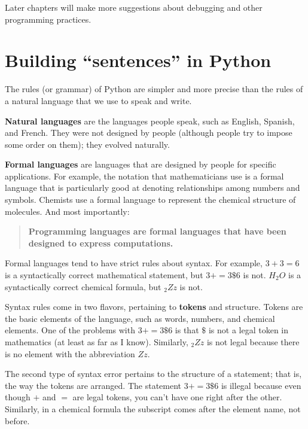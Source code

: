 \documentclass[10pt]{book}
\begin{document}
Later chapters will make more suggestions about debugging and other
programming practices.

\section{Building ``sentences'' in Python}

The rules (or grammar) of Python are simpler and more precise than 
the rules of a natural language that we use to speak and write.

{\bf Natural languages} are the languages people speak,
such as English, Spanish, and French.  They were not designed
by people (although people try to impose some order on them);
they evolved naturally.

{\bf Formal languages} are languages that are designed by people for
specific applications.  For example, the notation that mathematicians
use is a formal language that is particularly good at denoting
relationships among numbers and symbols.  Chemists use a formal
language to represent the chemical structure of molecules.  And
most importantly:

\begin{quote}
{\bf Programming languages are formal languages that have been
designed to express computations.}
\end{quote}

Formal languages tend to have strict rules about syntax.  For example,
$3 + 3 = 6$ is a syntactically correct mathematical statement, but 
$3 + = 3 \mbox{\$} 6$ is not.  $H_2O$ is a syntactically correct
chemical formula, but $_2Zz$ is not.

Syntax rules come in two flavors, pertaining to {\bf tokens} and
structure.  Tokens are the basic elements of the language, such as
words, numbers, and chemical elements.  One of the problems with $3 +
= 3 \mbox{\$} 6$ is that $\$$ is not a legal token in mathematics
(at least as far as I know).  Similarly, $_2Zz$ is not legal because
there is no element with the abbreviation $Zz$.


The second type of syntax error pertains to the structure of a
statement; that is, the way the tokens are arranged.  The statement $3
+ = 3 \mbox{\$} 6$ is illegal because even though $+$ and $=$ are
legal tokens, you can't have one right after the other.  Similarly,
in a chemical formula the subscript comes after the element name, not
before.
\end{document}
